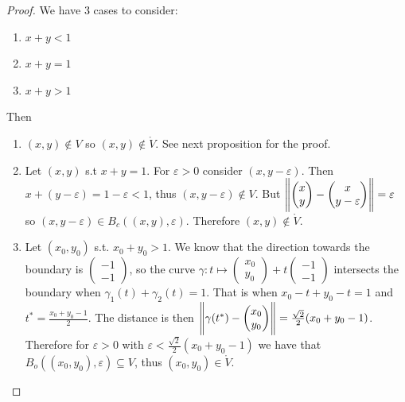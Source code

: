 \documentclass[10pt]{extarticle}
\begin{document}
\begin{proof}
    We have 3 cases to consider:
    \begin{enumerate}
        \item $x + y < 1$
        \item $x + y = 1$
        \item $x + y > 1$
    \end{enumerate}

    Then
    \begin{enumerate}
        \item $(x, y) \notin V$ so $(x, y) \notin \mathring{V}$. See next proposition for the proof.
        \item Let $(x, y)$ s.t $x + y = 1$.
              For $\varepsilon > 0$ consider $(x, y - \varepsilon)$.
              Then $x + (y - \varepsilon) = 1 - \varepsilon < 1$, thus $(x, y - \varepsilon) \notin V$.
              But $\norm{\begin{pmatrix}
                          x \\ y
                      \end{pmatrix} - \begin{pmatrix}
                          x \\ y - \varepsilon
                      \end{pmatrix}} = \varepsilon$ so $(x, y - \varepsilon) \in B_c((x, y), \varepsilon)$.
              Therefore $(x, y) \notin \mathring{V}$.

        \item Let $(x_0, y_0)$ s.t. $x_0 + y_0 > 1$.
              We know that the direction towards the boundary is $\begin{pmatrix}
                      -1 \\ -1
                  \end{pmatrix}$,
              so the curve $\gamma: t \mapsto \begin{pmatrix}
                      x_0 \\ y_0
                  \end{pmatrix} + t \begin{pmatrix}
                      -1 \\ -1
                  \end{pmatrix}$
              intersects the boundary when $\gamma_1(t) + \gamma_2(t) = 1$.
              That is when $x_0 - t + y_0 - t = 1$ and $t^* = \frac{x_0 + y_0 - 1}{2}$.
              The distance is then $\norm{\gamma(t^*) - \begin{pmatrix}
                          x_0 \\ y_0
                      \end{pmatrix}} = \frac{\sqrt{2}}{2} (x_0 + y_0 - 1)$.
              Therefore for $\varepsilon > 0$ with $\varepsilon < \frac{\sqrt{2}}{2} (x_0 + y_0 - 1)$ we have that $B_o((x_0, y_0), \varepsilon) \subseteq V$, thus $(x_0, y_0) \in \mathring{V}$.
    \end{enumerate}
\end{proof}
\end{document}
